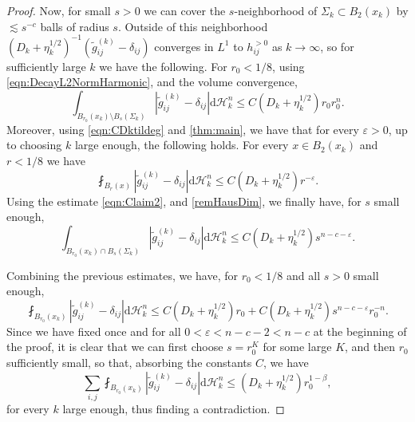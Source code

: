 \documentclass[12pt,a4paper,reqno]{amsart}
\renewcommand{\leq}{\leqslant}
\renewcommand{\d}{\ensuremath{\mathrm d}}
\renewcommand{\tilde}{\widetilde}
\begin{document}
\begin{proof}
    Now, for small $s > 0$ we can cover the $s$-neighborhood of $\Sigma_k \subset B_2(x_k)$ by $\lesssim s^{-c}$ balls of radius $s$. Outside of this neighborhood $(D_k+\eta_k^{1/2})^{-1}(\tilde g_{ij}^{(k)}-\delta_{ij})$ converges in $L^1$ to $h_{ij}^{>0}$ as $k\to\infty$, so for sufficiently large $k$ we have the following. For $r_0<1/8$, using \eqref{eqn:DecayL2NormHarmonic}, and the volume convergence,
    \[ \int_{B_{r_0}(x_k)\setminus B_s(\Sigma_k)} |\tilde{g}_{ij}^{(k)} - \delta_{ij}|\d\mathcal{H}^n_k \leq C(D_k+\eta_k^{1/2})r_0 r_0^n.
    \]
    Moreover, using \eqref{eqn:CDktildeg} and \cref{thm:main},  we have that for every $\varepsilon>0$, up to choosing $k$ large enough, the following holds. For every $x\in B_2(x_k)$ and $r<1/8$ we have
    \begin{equation}\label{eqn:Claim2}
    \fint_{B_r(x)}|\tilde g_{ij}^{(k)}-\delta_{ij}|\d\mathcal{H}^n_k\leq C(D_k+\eta_k^{1/2})r^{-\varepsilon}.
    \end{equation}
     Using the estimate \eqref{eqn:Claim2}, and \cref{remHausDim}, we finally have, for $s$ small enough,
    \[ \int_{B_{r_0}(x_k)\cap B_s(\Sigma_k)} |\tilde{g}_{ij}^{(k)} - \delta_{ij}|\d\mathcal{H}^n_k \leq C (D_k+\eta_k^{1/2}) s^{n-c-\varepsilon}.
    \]
    \smallskip
    
    Combining the previous estimates, we have, for $r_0<1/8$ and all $s>0$ small enough,
     \[ \fint_{B_{r_0}(x_k)} |\tilde{g}_{ij}^{(k)} - \delta_{ij}|\d\mathcal{H}^n_k \leq  C(D_k+\eta_k^{1/2}) r_0 + C(D_k+\eta_k^{1/2}) s^{n-c-\varepsilon}r_0^{-n}. \]
    Since we have fixed once and for all $0<\varepsilon < n-c-2 < n-c$ at the beginning of the proof, it is clear that we can first choose $s = r_0^K$ for some large $K$, and then $r_0$ sufficiently small, so that, absorbing the constants $C$, we have 
    \[ \sum_{i,j}\fint_{B_{r_0}(x_k)} |\tilde{g}_{ij}^{(k)} - \delta_{ij}|\d\mathcal{H}^n_k \leq (D_k+\eta_k^{1/2}) r_0^{1-\beta}, \]
    for every $k$ large enough, thus finding a contradiction.
\end{proof}
\end{document}
